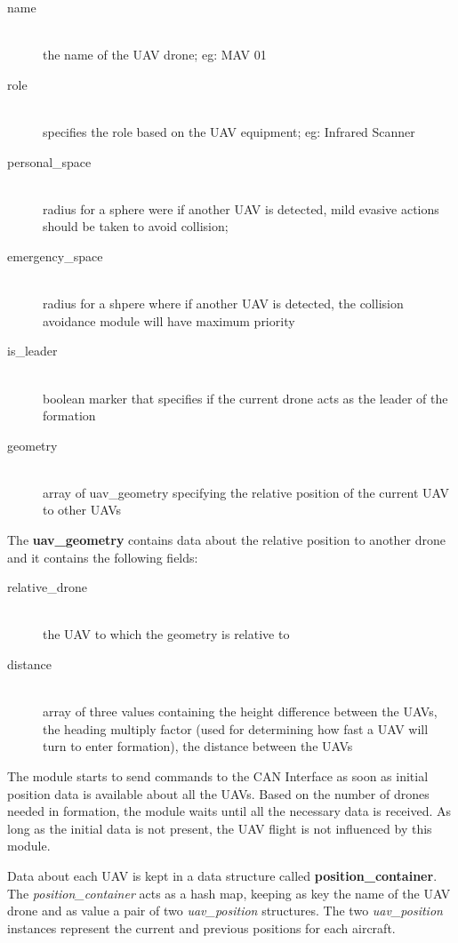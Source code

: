 \begin{description}
\item [name] \hfill \\ the name of the UAV drone; eg: MAV 01
\item [role] \hfill \\ specifies the role based on the UAV equipment; eg: Infrared Scanner
\item [personal_space] \hfill \\ radius for a sphere were if another UAV is detected, mild
evasive actions should be taken to avoid collision;
\item [emergency_space] \hfill \\ radius for a shpere where if another UAV is detected, 
the collision avoidance module will have maximum priority
\item [is_leader] \hfill \\ boolean marker that specifies if the current drone acts
as the leader of the formation
\item [geometry] \hfill \\ array of uav_geometry specifying the relative position of the 
current UAV to other UAVs
\end{description}

The \textbf{uav_geometry} contains data about the relative position to another drone and
it contains the following fields:

\begin{description}
\item [relative_drone] \hfill \\ the UAV to which the geometry is relative to
\item [distance] \hfill \\ array of three values containing the height difference
between the UAVs, the heading multiply factor (used for determining how fast a UAV
will turn to enter formation), the distance between the UAVs
\end{description}

The module starts to send commands to the CAN Interface as soon as initial 
position data is available about all the UAVs. Based on the number of drones
needed in formation, the module waits until all the necessary data is received.
As long as the initial data is not present, the UAV flight is not influenced 
by this module.

Data about each UAV is kept in a data structure called \textbf{position_container}.
The \textit{position_container} acts as a hash map, keeping as key the name 
of the UAV drone and as value a pair of two \textit{uav_position} structures.
The two \textit{uav_position} instances represent the current and previous
positions for each aircraft.

